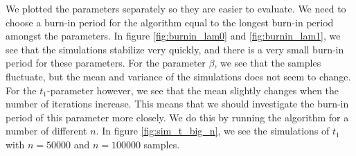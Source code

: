 We plotted the parameters separately so they are easier to evaluate. We need to choose a burn-in period for the algorithm equal to the longest burn-in period amongst the parameters. 
In figure \ref{fig:burnin_lam0} and \ref{fig:burnin_lam1}, we see that the simulations stabilize very quickly, and there is a very small burn-in period for these parameters. 
For the parameter $\beta$, we see that the samples fluctuate, but the mean and variance of the simulations does not seem to change. For the $t_1$-parameter however, we see that the mean slightly changes when the number of iterations increase. This means that we should investigate the burn-in period of this parameter more closely. We do this by running the algorithm for a number of different $n$. In figure \ref{fig:sim_t_big_n}, we see the simulations of $t_1$ with $n = 50000$ and $n = 100000$ samples. 

